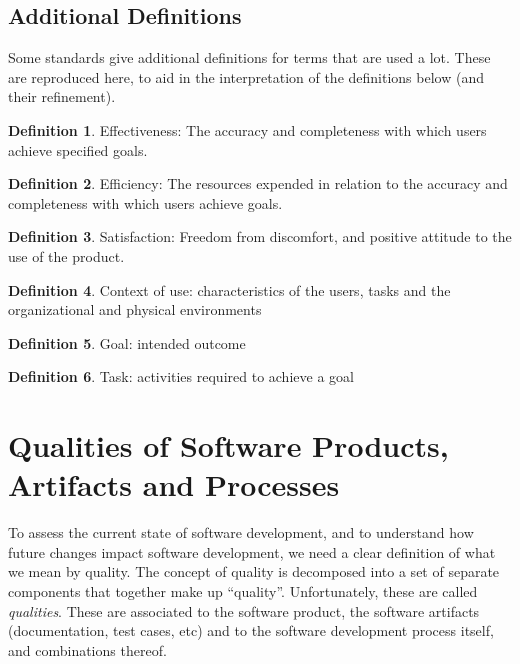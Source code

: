 \documentclass[letterpaper,cleveref]{lipics-v2019}
\theoremstyle{definition}
\newtheorem{defn}{Definition}
\begin{document}
\subsection{Additional Definitions}

Some standards give additional definitions for terms that are used a lot.
These are reproduced here, to aid in the interpretation of the definitions
below (and their refinement).

\begin{defn} 
\textsf{Effectiveness}:
The accuracy and completeness with which users achieve specified
goals. 
\cite{ISO9241:11}
\end{defn}

\begin{defn} 
\textsf{Efficiency}: 
The resources expended in relation to the accuracy and
completeness with which users achieve goals.
\cite{ISO9241:11}
\end{defn}

\begin{defn}
\textsf{Satisfaction}: 
Freedom from discomfort, and positive attitude to the use of the product.
\cite{ISO9241:11}
\end{defn}

\begin{defn}
\textsf{Context of use}:
characteristics of the users, tasks and the organizational and physical
environments 
\cite{ISO9241:11}
\end{defn}

\begin{defn}
\textsf{Goal}: intended outcome
\cite{ISO9241:11}
\end{defn}

\begin{defn}
\textsf{Task}: activities required to achieve a goal 
\cite{ISO9241:11}
\end{defn}

\section{Qualities of Software Products, Artifacts and
	Processes} \label{SecQualities}

To assess the current state of software development, and to understand how
future changes impact software development, we need a clear definition of what
we mean by quality.  The concept of quality is decomposed into a set of separate
components that together make up ``quality''. Unfortunately, these are
called \emph{qualities}. These are associated to the software product,
the software artifacts (documentation, test cases, etc) and to the software
development process itself, and combinations thereof.
\end{document}

